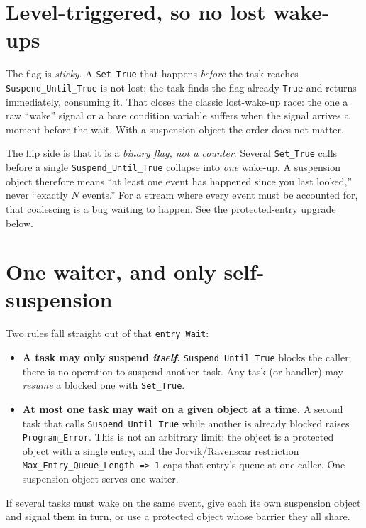 \section{Level-triggered, so no lost wake-ups}

The flag is \emph{sticky}. A \texttt{Set\_True} that happens \emph{before} the task
reaches \texttt{Suspend\_Until\_True} is not lost: the task finds the flag already
\texttt{True} and returns immediately, consuming it. That closes the classic
lost-wake-up race: the one a raw ``wake'' signal or a bare condition variable
suffers when the signal arrives a moment before the wait. With a suspension object
the order does not matter.

The flip side is that it is a \emph{binary flag, not a counter}. Several
\texttt{Set\_True} calls before a single \texttt{Suspend\_Until\_True} collapse into
\emph{one} wake-up. A suspension object therefore means ``at least one event has
happened since you last looked,'' never ``exactly $N$ events.'' For a stream where
every event must be accounted for, that coalescing is a bug waiting to happen. See
the protected-entry upgrade below.

\section{One waiter, and only self-suspension}

Two rules fall straight out of that \texttt{entry Wait}:

\begin{itemize}
\item \textbf{A task may only suspend \emph{itself}.} \texttt{Suspend\_Until\_True}
  blocks the caller; there is no operation to suspend another task. Any task (or
  handler) may \emph{resume} a blocked one with \texttt{Set\_True}.
\item \textbf{At most one task may wait on a given object at a time.} A second task
  that calls \texttt{Suspend\_Until\_True} while another is already blocked raises
  \texttt{Program\_Error}. This is not an arbitrary limit: the object is a protected
  object with a single entry, and the Jorvik/Ravenscar restriction
  \texttt{Max\_Entry\_Queue\_Length =>\ 1} caps that entry's queue at one caller.
  One suspension object serves one waiter.
\end{itemize}

If several tasks must wake on the same event, give each its own suspension object
and signal them in turn, or use a protected object whose barrier they all share.

